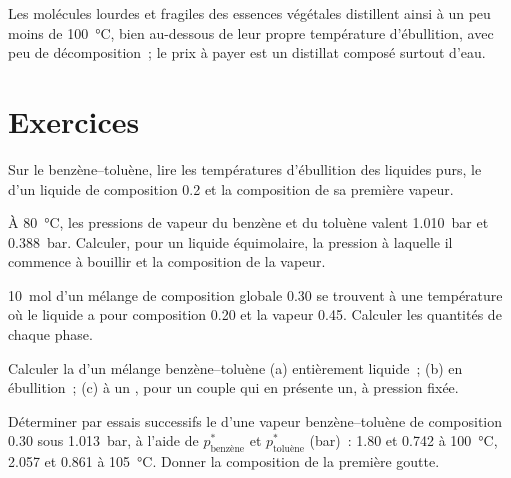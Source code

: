 Les molécules lourdes et fragiles des essences végétales distillent ainsi à un peu
moins de \qty{100}{\degreeCelsius}, bien au-dessous de leur propre température d'ébullition, avec
peu de décomposition~; le prix à payer est un distillat composé surtout d'eau.

\section{Exercices}

\begin{exercise}[$\star$]\label{exo:b2:liquid-vapour-diagrams:1}
Sur le  benzène--toluène, lire les températures d'ébullition des liquides
purs, le  d'un liquide de composition 0.2 et la composition de
sa première vapeur.
\end{exercise}

\begin{exercise}[$\star$]\label{exo:b2:liquid-vapour-diagrams:2}
À \qty{80}{\degreeCelsius}, les pressions de vapeur du benzène et du toluène valent
\qty{1.010}{bar} et \qty{0.388}{bar}. Calculer, pour un liquide équimolaire, la
pression à laquelle il commence à bouillir et la composition de la vapeur.
\end{exercise}

\begin{exercise}[$\star$]\label{exo:b2:liquid-vapour-diagrams:3}
\qty{10}{mol} d'un mélange de composition globale 0.30 se trouvent à une température
où le liquide a pour composition 0.20 et la vapeur 0.45. Calculer les quantités
de chaque phase.
\end{exercise}

\begin{exercise}[$\star$]\label{exo:b2:liquid-vapour-diagrams:4}
Calculer la  d'un mélange benzène--toluène (a) entièrement liquide~; (b)
en ébullition~; (c) à un , pour un couple qui en présente un, à pression fixée.
\end{exercise}

\begin{exercise}[$\star\star$]\label{exo:b2:liquid-vapour-diagrams:5}
Déterminer par essais successifs le  d'une vapeur benzène--toluène de composition 0.30 sous
\qty{1.013}{bar}, à l'aide de $p^*_{\text{benzène}}$ et $p^*_{\text{toluène}}$
(\unit{bar})~: 1.80 et 0.742 à \qty{100}{\degreeCelsius}, 2.057 et 0.861 à
\qty{105}{\degreeCelsius}. Donner la composition de la première goutte.
\end{exercise}

